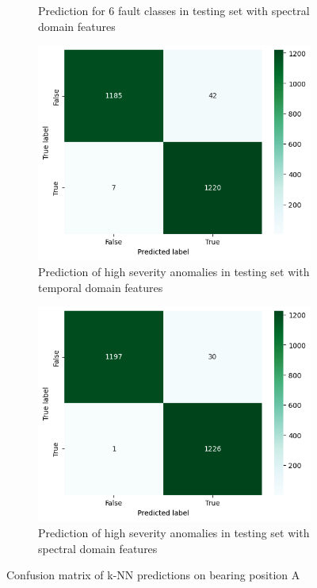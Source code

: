 \begin{figure}[ht]
\begin{subfigure}[b]{0.49\textwidth}
        \caption{Prediction for 6 fault classes in testing set with spectral domain features}
    \end{subfigure}
    \begin{subfigure}[b]{0.49\textwidth}
        \includegraphics[width=\textwidth]{assets/design/KNN-temporal-confusion-matrix-anomaly90.png}
        \caption{Prediction of high severity anomalies in testing set with temporal domain features}
    \end{subfigure}
    \hfill
    \begin{subfigure}[b]{0.49\textwidth}
        \includegraphics[width=\textwidth]{assets/design/KNN-spectral-confusion-matrix-anomaly90.png}
        \caption{Prediction of high severity anomalies in testing set with spectral domain features}
    \end{subfigure}
    \caption{Confusion matrix of k-NN predictions on bearing position A}
    \label{fig:design:KNN-confusion-matrix}
\end{figure}

